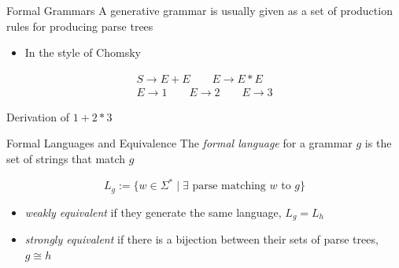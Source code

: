 \documentclass[10pt]{beamer}
\begin{document}
\begin{frame}{Formal Grammars}
  A generative grammar is usually given as a set of production rules
  for producing parse trees
  \begin{itemize}
    \item In the style of Chomsky
  \end{itemize}
  \vspace{-0.7cm}
  \begin{center}
      \begin{gather*}
        S \to E + E \qquad E \to E * E \\
        E \to 1 \qquad E \to 2 \qquad E \to 3
      \end{gather*}
  \end{center}

  \begin{exampleblock}{Derivation of $1+2*3$}
    \begin{center}
    \end{center}
  \end{exampleblock}
\end{frame}

\begin{frame}{Formal Languages and Equivalence}
  The \emph{formal language} for a grammar $g$ is the set of strings that match $g$

  \[
    L_{g} := \{ w \in \Sigma^{*} \mid \exists \text{ parse matching } w \text{ to } g\}
  \]


  \begin{itemize}
    \item<4-> \emph{weakly equivalent} if they generate the same language, $L_{g} = L_{h}$
    \item<4-> \emph{strongly equivalent} if there is a bijection between their sets of parse trees, $g \cong h$
  \end{itemize}
\end{frame}
\end{document}
